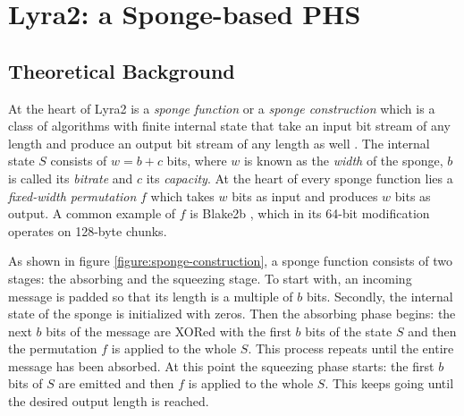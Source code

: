 \chapter{Lyra2: a Sponge-based PHS}
\label{sec:implementation-details}
\label{chapter:lyra2}

\section{Theoretical Background}
\label{sec:lyra2-brief-description}

At the heart of Lyra2 is a \emph{sponge function} or a \emph{sponge construction} which is a class of algorithms with finite internal state that take an input bit stream of any length and produce an output bit stream of any length as well \cite{bertoni2007sponge}. The internal state \(S\) consists of \(w = b + c\) bits, where \(w\) is known as the \emph{width} of the sponge, \(b\) is called its \emph{bitrate} and \(c\) its \emph{capacity}. At the heart of every sponge function lies a \emph{fixed-width permutation} \(f\) which takes \(w\) bits as input and produces \(w\) bits as output. A common example of \(f\) is Blake2b \cite{aumasson:2013:blake2}, which in its 64-bit modification operates on 128-byte chunks.

As shown in figure \ref{figure:sponge-construction}, a sponge function consists of two stages: the absorbing and the squeezing stage. To start with, an incoming message is padded so that its length is a multiple of \(b\) bits. Secondly, the internal state of the sponge is initialized with zeros. Then the absorbing phase begins: the next \(b\) bits of the message are XORed with the first \(b\) bits of the state \(S\) and then the permutation \(f\) is applied to the whole \(S\). This process repeats until the entire message has been absorbed. At this point the squeezing phase starts: the first \(b\) bits of \(S\) are emitted and then \(f\) is applied to the whole \(S\). This keeps going until the desired output length is reached.

